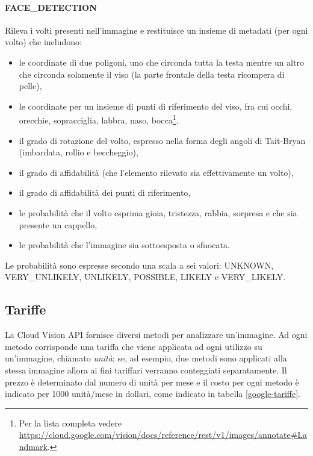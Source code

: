 \paragraph{\textsf{FACE\_DETECTION}} Rileva i volti presenti nell'immagine e restituisce un insieme di metadati (per ogni volto) che includono:
\begin{itemize}
\item le coordinate di due poligoni, uno che circonda tutta la testa mentre un altro che circonda solamente il viso (la parte frontale della testa ricompera di pelle),
\item le coordinate per un insieme di punti di riferimento del viso, fra cui occhi, orecchie, sopracciglia, labbra, naso, bocca\footnote{Per la lista completa vedere \url{https://cloud.google.com/vision/docs/reference/rest/v1/images/annotate\#Landmark}.}.
\item il grado di rotazione del volto, espresso nella forma degli angoli di Tait-Bryan (imbardata, rollio e beccheggio), 
\item il grado di affidabilità (che l'elemento rilevato sia effettivamente un volto),
\item il grado di affidabilità dei punti di riferimento,
\item le probabilità che il volto esprima gioia, tristezza, rabbia, sorpresa e che sia presente un cappello, 
\item le probabilità che l'immagine sia sottoesposta o sfuocata.
\end{itemize}
Le probabilità sono espresse secondo una scala a sei valori: \textsf{UNKNOWN}, \textsf{VERY\_UNLIKELY}, \textsf{UNLIKELY}, \textsf{POSSIBLE}, \textsf{LIKELY} e \textsf{VERY\_LIKELY}.

\subsection{Tariffe}
La Cloud Vision API fornisce diversi metodi per analizzare un'immagine.
Ad ogni metodo corrisponde una tariffa che viene applicata ad ogni utilizzo su un'immagine, chiamato \textit{unità};
se, ad esempio, due metodi sono applicati alla stessa immagine allora ai fini tariffari verranno conteggiati separatamente.
Il prezzo è determinato dal numero di unità per mese e il costo per ogni metodo è indicato per 1000 unità/mese in dollari, come indicato in tabella \ref{google-tariffe}.


